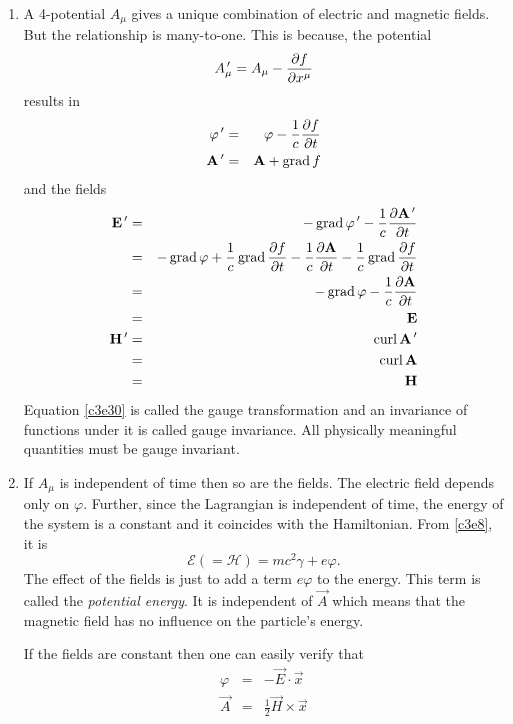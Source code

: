 \begin{enumerate}
\item A 4-potential $A_\mu$ gives a unique combination of electric and magnetic
fields. But the relationship is many-to-one. This is because, the potential
\begin{equation}\label{c3e30}
A_\mu^{\,\prime} = A_\mu - \frac{\partial{f}}{\partial{x^\mu}}
\end{equation}
results in
\begin{eqnarray}
\varphi^{\,\prime} &=& \varphi - \frac{1}{c}\frac{\partial{f}}{\partial{t}} \label{c3e31} \\
\mathbf{A}^{\,\prime} &=& \mathbf{A} + \operatorname{grad} f \label{c3e32}
\end{eqnarray}
and the fields
\begin{eqnarray}
\mathbf{E}^{\,\prime} &=& -\operatorname{grad}{\varphi^{\,\prime}} - \frac{1}{c}\frac{\partial{\mathbf{A}^{\,\prime}}}{\partial{t}} \nonumber \\
 &=& -\operatorname{grad}\varphi + \frac{1}{c}\operatorname{grad}\frac{\partial{f}}{\partial{t}} - 
      \frac{1}{c}\frac{\partial{\mathbf{A}}}{\partial{t}} - \frac{1}{c}\operatorname{grad}{\frac{\partial{f}}{\partial{t}}} \nonumber \\
 &=& -\operatorname{grad}\varphi - \frac{1}{c}\frac{\partial{\mathbf{A}}}{\partial{t}} \nonumber \\
 &=& \mathbf{E} \label{c3e33} \\
\mathbf{H}^{\,\prime} &=& \operatorname{curl}\mathbf{A}^{\,\prime} \nonumber \\
 &=& \operatorname{curl}\mathbf{A} \nonumber \\
 &=& \mathbf{H} \label{c3e34}
\end{eqnarray}
Equation \eqref{c3e30} is called the gauge transformation and an invariance of
functions under it is called gauge invariance. All physically meaningful quantities
must be gauge invariant.

\item If $A_\mu$ is independent of time then so are the fields. The electric field
depends only on $\varphi$. Further, since the Lagrangian is independent of time, the
energy of the system is a constant and it coincides with the Hamiltonian. From
\eqref{c3e8}, it is
\begin{equation}\label{c3e35}
\mathcal{E} (= \mathcal{H}) = mc^2\gamma + e\varphi.
\end{equation} 
The effect of the fields is just to add a term $e\varphi$ to the energy. This term
is called the \emph{potential energy}. It is independent of $\vec{A}$ which means
that the magnetic field has no influence on the particle's energy.

If the fields are constant then one can easily verify that
\begin{eqnarray}
\varphi &=& -\vec{E}\cdot\vec{x} \label{c3e36} \\
\vec{A} &=& \frac{1}{2}\vec{H} \times \vec{x} \label{c3e37}
\end{eqnarray}


\end{enumerate}
